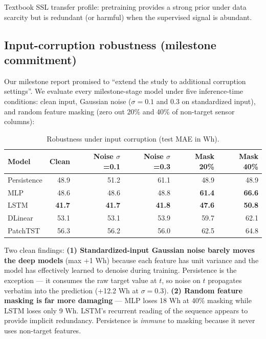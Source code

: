 \documentclass[11pt,letterpaper]{article}
\begin{document}
Textbook SSL transfer profile: pretraining provides a strong prior under
data scarcity but is redundant (or harmful) when the supervised signal is
abundant.

\subsection{Input-corruption robustness (milestone commitment)}

Our milestone report promised to ``extend the study to additional
corruption settings''. We evaluate every milestone-stage model under five
inference-time conditions: clean input, Gaussian noise ($\sigma = 0.1$ and
$0.3$ on standardized input), and random feature masking (zero out 20\%
and 40\% of non-target sensor columns):

\begin{table}[H]
\centering
\small
\begin{tabular}{lrrrrr}
\toprule
\textbf{Model} & \textbf{Clean} & \textbf{Noise $\sigma$=0.1} & \textbf{Noise $\sigma$=0.3} & \textbf{Mask 20\%} & \textbf{Mask 40\%} \\
\midrule
Persistence & 48.9          & 51.2          & 61.1          & 48.9          & 48.9          \\
MLP         & 48.6          & 48.6          & 48.8          & \textbf{61.4} & \textbf{66.6} \\
LSTM        & \textbf{41.7} & \textbf{41.7} & \textbf{41.8} & \textbf{47.6} & \textbf{50.8} \\
DLinear     & 53.1          & 53.1          & 53.9          & 59.7          & 62.1          \\
PatchTST    & 56.3          & 56.2          & 56.0          & 62.5          & 64.8          \\
\bottomrule
\end{tabular}
\caption{Robustness under input corruption (test MAE in Wh).}
\end{table}

Two clean findings: \textbf{(1) Standardized-input Gaussian noise barely
moves the deep models} (max +1 Wh) because each feature has unit variance
and the model has effectively learned to denoise during training.
Persistence is the exception --- it consumes the raw target value at $t$,
so noise on $t$ propagates verbatim into the prediction (+12.2 Wh at
$\sigma=0.3$). \textbf{(2) Random feature masking is far more damaging}
--- MLP loses 18 Wh at 40\% masking while LSTM loses only 9 Wh. LSTM's
recurrent reading of the sequence appears to provide implicit redundancy.
Persistence is \emph{immune} to masking because it never uses non-target
features.
\end{document}
